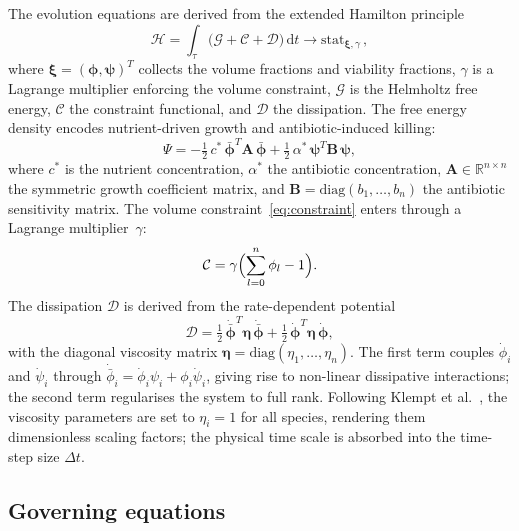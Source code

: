 \documentclass[11pt,a4paper]{article}
\newcommand{\bphi}{\boldsymbol{\phi}}
\newcommand{\bpsi}{\boldsymbol{\psi}}
\newcommand{\Real}{\mathbb{R}}
\begin{document}
The evolution equations are derived from the extended Hamilton principle~\cite{JunkerBalzani2021ExtendedHamilton, JunkerBodeHackl2025Holistic}
\begin{equation}
\mathcal{H} = \int_\tau \bigl(\mathcal{G} + \mathcal{C} + \mathcal{D}\bigr)\,\mathrm{d}t \to \mathrm{stat}_{\boldsymbol{\xi},\gamma}\,,
\label{eq:hamilton}
\end{equation}
where $\boldsymbol{\xi}=(\boldsymbol{\phi},\boldsymbol{\psi})^T$ collects the volume fractions and viability fractions, $\gamma$ is a Lagrange multiplier enforcing the volume constraint, $\mathcal{G}$ is the Helmholtz free energy, $\mathcal{C}$ the constraint functional, and $\mathcal{D}$ the dissipation.
The free energy density encodes nutrient-driven growth and antibiotic-induced killing:
\begin{equation}
\Psi = -\tfrac{1}{2}\,c^*\,\bar{\bphi}^T \mathbf{A}\,\bar{\bphi}
      + \tfrac{1}{2}\,\alpha^*\,\bpsi^T \mathbf{B}\,\bpsi,
\label{eq:psi}
\end{equation}
where $c^*$ is the nutrient concentration, $\alpha^*$ the antibiotic concentration, $\mathbf{A}\in\Real^{n\times n}$ the symmetric growth coefficient matrix, and $\mathbf{B}=\mathrm{diag}(b_1,\dots,b_n)$ the antibiotic sensitivity matrix.
The volume constraint~\eqref{eq:constraint} enters through a Lagrange multiplier~$\gamma$:
\begin{equation}
\mathcal{C} = \gamma\Bigl(\sum_{l=0}^{n}\phi_l - 1\Bigr).
\label{eq:cfunc}
\end{equation}
The dissipation $\mathcal{D}$ is derived from the rate-dependent potential~\cite{Klempt2025ContinuumBiofilm}
\begin{equation}
\mathcal{D} = \tfrac{1}{2}\,\dot{\bar{\bphi}}^T\boldsymbol{\eta}\,\dot{\bar{\bphi}}
          + \tfrac{1}{2}\,\dot{\bphi}^T\boldsymbol{\eta}\,\dot{\bphi},
\label{eq:dissipation}
\end{equation}
with the diagonal viscosity matrix $\boldsymbol{\eta}=\mathrm{diag}(\eta_1,\dots,\eta_n)$.
The first term couples $\dot\phi_i$ and $\dot\psi_i$ through $\dot{\bar\phi}_i = \dot\phi_i\psi_i + \phi_i\dot\psi_i$, giving rise to non-linear dissipative interactions; the second term regularises the system to full rank.
Following Klempt et al.~\cite{Klempt2025ContinuumBiofilm}, the viscosity parameters are set to $\eta_i=1$ for all species, rendering them dimensionless scaling factors; the physical time scale is absorbed into the time-step size $\Delta t$.

\subsection{Governing equations}
\end{document}
